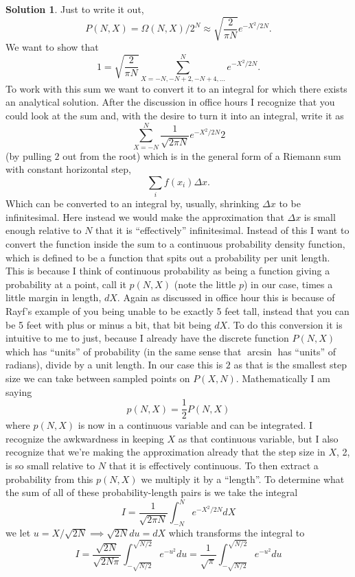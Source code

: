 \documentclass[10pt]{article}
\theoremstyle{definition}
\newtheorem{soln}{Solution}
\begin{document}
\begin{soln}
  Just to write it out, $$P (N, X) = \Omega(N, X)/2^N\approx \sqrt{\frac{2}{\pi N}}e^{-X^2/2N}.$$
  We want to show that
  $$1=\sqrt{\frac{2}{\pi N}}\sum_{X=-N, -N+2, -N+4,\dots}^{N}e^{-X^2/2N}.$$
  To work with this sum we want to convert it to an integral for which there exists an analytical solution.
  After the discussion in office hours I recognize that you could look at the sum and, with the desire to turn it into an integral,
  write it as
  $$\sum_{X=-N}^{N} \frac{1}{\sqrt{2\pi N}}e^{-X^2/2N}2$$
  (by pulling $2$ out from the root) which is in the general form of a Riemann sum with constant horizontal step,
  $$\sum_{i} f(x_i)\Delta x.$$
  Which can be converted to an integral by, usually, shrinking $\Delta x$ to be infinitesimal. Here instead we would make the approximation
  that $\Delta x$ is small enough relative to $N$ that it is ``effectively'' infinitesimal. Instead of this I want to
  convert the function inside the sum to a continuous probability density function, which is defined to be a function that spits out a probability per unit length.
  This is because I think of continuous probability as being a function giving a probability at a point, call it $p(N,X)$ (note the little $p$) in our case, times
  a little margin in length, $dX$. Again as discussed in office hour this is because of Rayf's example of you being unable to be exactly 5 feet tall,
  instead that you can be 5 feet with plus or minus a bit, that bit being $dX$. To do this conversion it is intuitive to me to just, because I already have the discrete
  function $P(N,X)$ which has ``units'' of probability (in the same sense that $\arcsin$ has ``units'' of radians),
  divide by a unit length. In our case this is $2$ as that is the smallest step size we can take between sampled points on $P(X,N)$. Mathematically I am saying
  $$p(N,X)=\frac{1}{2}P(N,X)$$
  where $p(N,X)$ is now in a continuous variable and can be integrated. I recognize the awkwardness in keeping $X$ as that continuous variable,
  but I also recognize that we're making the approximation already that the step size in $X$, 2, is so small relative to $N$ that it is effectively continuous.
  To then extract a probability from this $p(N,X)$ we multiply it by a ``length''. To determine what the sum of all of these probability-length pairs is we take
  the integral
  $$I=\frac{1}{\sqrt{2\pi N}}\int_{-N}^{N}e^{-X^2/2N}dX$$
  we let $u=X/\sqrt{2N}\implies \sqrt{2N}du=dX$ which transforms the integral to
  $$I=\frac{\sqrt{2N}}{\sqrt{2N\pi }}\int_{-\sqrt{N/2}}^{\sqrt{N/2}}e^{-u^2}du=\frac{1}{\sqrt{\pi}}\int_{-\sqrt{N/2}}^{\sqrt{N/2}}e^{-u^2}du$$

\end{soln}
\end{document}

